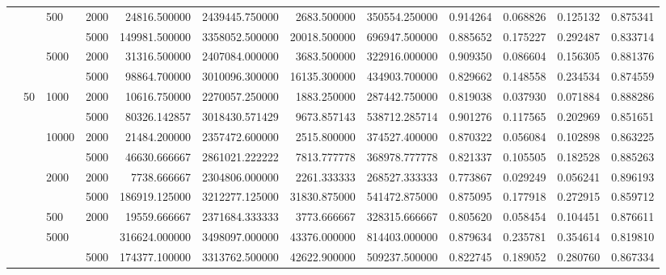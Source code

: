 \begin{tabular}{llllrrrrrrrr}
     &    & 500 & 2000 &   24816.500000 &  2439445.750000 &   2683.500000 &  350554.250000 &   0.914264 &  0.068826 &  0.125132 &  0.875341 \\
     &    &      & 5000 &  149981.500000 &  3358052.500000 &  20018.500000 &  696947.500000 &   0.885652 &  0.175227 &  0.292487 &  0.833714 \\
     &    & 5000 & 2000 &   31316.500000 &  2407084.000000 &   3683.500000 &  322916.000000 &   0.909350 &  0.086604 &  0.156305 &  0.881376 \\
     &    &      & 5000 &   98864.700000 &  3010096.300000 &  16135.300000 &  434903.700000 &   0.829662 &  0.148558 &  0.234534 &  0.874559 \\
     & 50 & 1000 & 2000 &   10616.750000 &  2270057.250000 &   1883.250000 &  287442.750000 &   0.819038 &  0.037930 &  0.071884 &  0.888286 \\
     &    &      & 5000 &   80326.142857 &  3018430.571429 &   9673.857143 &  538712.285714 &   0.901276 &  0.117565 &  0.202969 &  0.851651 \\
     &    & 10000 & 2000 &   21484.200000 &  2357472.600000 &   2515.800000 &  374527.400000 &   0.870322 &  0.056084 &  0.102898 &  0.863225 \\
     &    &      & 5000 &   46630.666667 &  2861021.222222 &   7813.777778 &  368978.777778 &   0.821337 &  0.105505 &  0.182528 &  0.885263 \\
     &    & 2000 & 2000 &    7738.666667 &  2304806.000000 &   2261.333333 &  268527.333333 &   0.773867 &  0.029249 &  0.056241 &  0.896193 \\
     &    &      & 5000 &  186919.125000 &  3212277.125000 &  31830.875000 &  541472.875000 &   0.875095 &  0.177918 &  0.272915 &  0.859712 \\
     &    & 500 & 2000 &   19559.666667 &  2371684.333333 &   3773.666667 &  328315.666667 &   0.805620 &  0.058454 &  0.104451 &  0.876611 \\
     &    & 5000 &      &  316624.000000 &  3498097.000000 &  43376.000000 &  814403.000000 &   0.879634 &  0.235781 &  0.354614 &  0.819810 \\
     &    &      & 5000 &  174377.100000 &  3313762.500000 &  42622.900000 &  509237.500000 &   0.822745 &  0.189052 &  0.280760 &  0.867334 \\
\bottomrule
\end{tabular}
